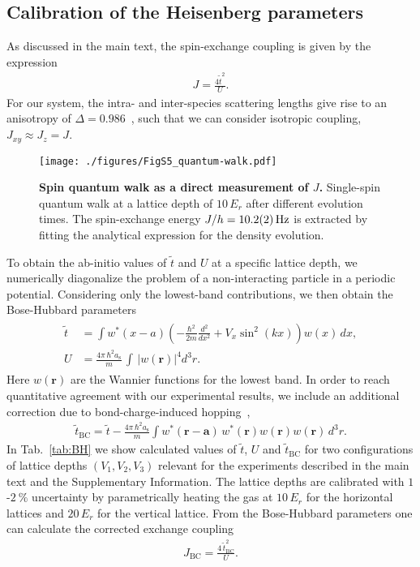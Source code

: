 \documentclass[
 reprint,
 superscriptaddress,
 amsmath,amssymb,
 aps,
 pra,
]{revtex4-2}
\begin{document}
\subsection{Calibration of the Heisenberg parameters}

As discussed in the main text, the spin-exchange coupling is given by the expression
\begin{align}
    J = \frac{4\tilde{t}^2}{U}.
\end{align}
For our system, the intra- and inter-species scattering lengths give rise to an anisotropy of $\Delta = 0.986$~\cite{Pertot2010}, such that we can consider isotropic coupling, $J_{xy} \approx J_z = J$.



\begin{figure}
    \centering
    \texttt{[image: ./figures/FigS5\_quantum-walk.pdf]}
    \caption{\textbf{Spin quantum walk as a direct measurement of $J$.}
        Single-spin quantum walk at a lattice depth of $10\,E_r$ after different evolution times. The spin-exchange energy $J / h = \SI{10.2 (2)}{Hz}$ is extracted by fitting the analytical expression for the density evolution.
    }
    \label{fig:quantum-walk}
\end{figure}

To obtain the ab-initio values of $\tilde{t}$ and $U$ at a specific lattice depth, we numerically diagonalize the problem of a non-interacting particle in a periodic potential. Considering only the lowest-band contributions, we then obtain the Bose-Hubbard parameters
\begin{align}\begin{split}
    \tilde{t} &= \int w^*(x-a) \left( -\frac{\hbar^2}{2m}\frac{d^2}{dx^2}+V_x \sin^2(k x) \right) w(x)\, dx,\\
    U &= \frac{4\pi\,\hbar^2 a_{\mathrm{s}}}{m}\, \int\,|w(\mathbf{r}) |^4 d^3r.
\end{split}\end{align}
Here $w(\mathbf{r})$ are the Wannier functions for the lowest band.
In order to reach quantitative agreement with our experimental results, we include an additional correction due to bond-charge-induced hopping~\cite{Luhmann2012},
\begin{align}
    \tilde{t}_\mathrm{BC} = \tilde{t} - \frac{4\pi\,\hbar^2 a_{\mathrm{s}}}{m}
    \int w^*(\mathbf{r}-\mathbf{a})\,w^*(\mathbf{r}) w(\mathbf{r}) w(\mathbf{r})\,d^3r.
\end{align}
In Tab.~\ref{tab:BH} we show calculated values of $\tilde{t}$, $U$ and $\tilde{t}_\mathrm{BC}$ for two configurations of lattice depths $(V_1, V_2, V_3)$ relevant for the experiments described in the main text and the Supplementary Information. The lattice depths are calibrated with $1$-$\SI{2}{\percent}$ uncertainty by parametrically heating the gas at $10\,E_r$ for the horizontal lattices and $20\,E_r$ for the vertical lattice.
From the Bose-Hubbard parameters one can calculate the corrected exchange coupling 
\begin{align}
    J_\mathrm{BC} = \frac{4\,\tilde{t}_\mathrm{BC}^2}{U}.
\end{align}
\end{document}
